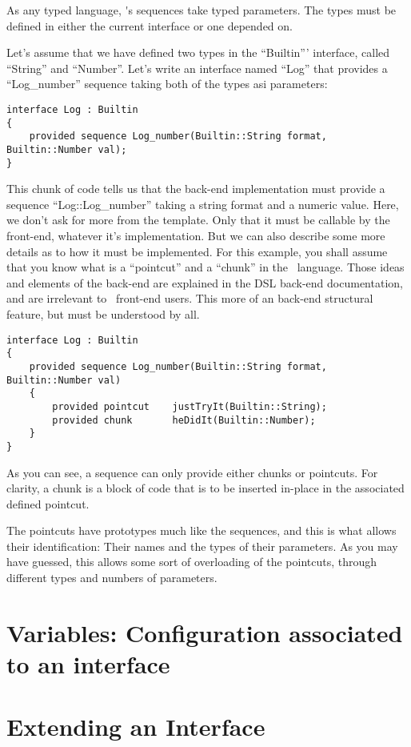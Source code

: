 \documentclass[american]{rtxreport}
\begin{document}
As any typed language, \rtx\'{}s sequences take typed parameters. The types
must be defined in either the current interface or one depended on.

Let's assume that we have defined two types in the ``Builtin''' interface,
called ``String'' and ``Number''. Let's write an interface named ``Log''
that provides a ``Log\_number'' sequence taking both of the types asi
parameters:
\begin{lstlisting}
interface Log : Builtin
{
    provided sequence Log_number(Builtin::String format, Builtin::Number val);
}
\end{lstlisting}

This chunk of code tells us that the back-end implementation must provide
a sequence ``Log::Log\_number'' taking a string format and a numeric value.
Here, we don't ask for more from the template. Only that it must be callable
by the front-end, whatever it's implementation. But we can also describe some
more details as to how it must be implemented. For this example, you shall
assume that you know what is a ``pointcut'' and a ``chunk'' in the \rtx\
language. Those ideas and elements of the back-end are explained in the
DSL back-end documentation, and are irrelevant to \rtx\ front-end users.
This more of an back-end structural feature, but must be understood by all.

\begin{lstlisting}
interface Log : Builtin
{
    provided sequence Log_number(Builtin::String format, Builtin::Number val)
    {
        provided pointcut    justTryIt(Builtin::String);
        provided chunk       heDidIt(Builtin::Number);
    }
}
\end{lstlisting}
As you can see, a sequence can only provide either chunks or pointcuts.
For clarity, a chunk is a block of code that is to be inserted in-place in
the associated defined pointcut.

The pointcuts have prototypes much like the sequences, and this is what allows
their identification: Their names and the types of their parameters. As you
may have guessed, this allows some sort of overloading of the pointcuts,
through different types and numbers of parameters.


\section{Variables: Configuration associated to an interface}


\section{Extending an Interface}
\end{document}
